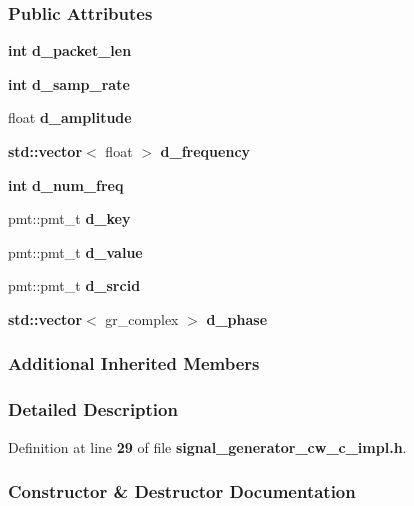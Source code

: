 \subsubsection*{Public Attributes}
\begin{DoxyCompactItemize}
\item 
{\bf int} {\bf d\+\_\+packet\+\_\+len}
\item 
{\bf int} {\bf d\+\_\+samp\+\_\+rate}
\item 
float {\bf d\+\_\+amplitude}
\item 
{\bf std\+::vector}$<$ float $>$ {\bf d\+\_\+frequency}
\item 
{\bf int} {\bf d\+\_\+num\+\_\+freq}
\item 
pmt\+::pmt\+\_\+t {\bf d\+\_\+key}
\item 
pmt\+::pmt\+\_\+t {\bf d\+\_\+value}
\item 
pmt\+::pmt\+\_\+t {\bf d\+\_\+srcid}
\item 
{\bf std\+::vector}$<$ gr\+\_\+complex $>$ {\bf d\+\_\+phase}
\end{DoxyCompactItemize}
\subsubsection*{Additional Inherited Members}


\subsubsection{Detailed Description}


Definition at line {\bf 29} of file {\bf signal\+\_\+generator\+\_\+cw\+\_\+c\+\_\+impl.\+h}.



\subsubsection{Constructor \& Destructor Documentation}
